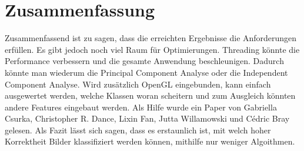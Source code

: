 \documentclass[liststotoc,11pt,a4paper]{article}
\begin{document}
\section{Zusammenfassung}
Zusammenfassend ist zu sagen, dass die erreichten Ergebnisse die Anforderungen erfüllen. Es gibt jedoch noch viel Raum für Optimierungen. Threading könnte die Performance verbessern und die gesamte Anwendung beschleunigen. Dadurch könnte man wiederum die Principal Component Analyse oder die Independent Component Analyse. 
Wird zusätzlich OpenGL eingebunden, kann einfach ausgewertet werden, welche Klassen woran scheitern und zum Ausgleich könnten andere Features eingebaut werden.
Als Hilfe wurde ein Paper von Gabriella Csurka, Christopher R. Dance, Lixin Fan, Jutta Willamowski und Cédric Bray gelesen.\cite{pizza}
Als Fazit lässt sich sagen, dass es erstaunlich ist, mit welch hoher Korrektheit Bilder klassifiziert werden können, mithilfe nur weniger Algoithmen.


\newpage
{}
\setcounter{page}{3}
\renewcommand{\refname}{Referenzen}

\end{document}
